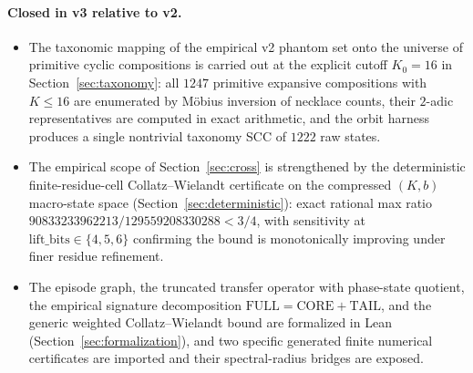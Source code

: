 \documentclass[11pt,a4paper]{article}
\theoremstyle{definition}
\newcommand{\full}{\mathrm{FULL}}
\newcommand{\core}{\mathrm{CORE}}
\newcommand{\tail}{\mathrm{TAIL}}
\begin{document}
\paragraph{Closed in v3 relative to v2.}
\begin{itemize}
  \item The taxonomic mapping of the empirical v2 phantom set onto
        the universe of primitive cyclic compositions is carried
        out at the explicit cutoff $K_0 = 16$ in
        Section~\ref{sec:taxonomy}: all $1247$ primitive expansive
        compositions with $K \le 16$ are enumerated by M\"obius
        inversion of necklace counts, their $2$-adic
        representatives are computed in exact arithmetic, and the
        orbit harness produces a single nontrivial taxonomy SCC of
        $1222$ raw states.
  \item The empirical scope of Section~\ref{sec:cross} is
        strengthened by the deterministic finite-residue-cell
        Collatz--Wielandt certificate on the compressed $(K, b)$
        macro-state space (Section~\ref{sec:deterministic}): exact
        rational max ratio $90833233962213/129559208330288 < 3/4$,
        with sensitivity at $\mathrm{lift\_bits} \in \{4, 5, 6\}$
        confirming the bound is monotonically improving under
        finer residue refinement.
  \item The episode graph, the truncated transfer operator with
        phase-state quotient, the empirical signature
        decomposition $\full = \core + \tail$, and the generic
        weighted Collatz--Wielandt bound are formalized in Lean
        (Section~\ref{sec:formalization}), and two specific
        generated finite numerical certificates are imported and
        their spectral-radius bridges are exposed.
\end{itemize}
\end{document}
